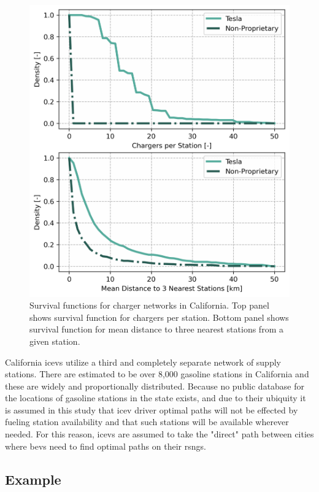 \documentclass[11pt]{article}
\begin{document}
\begin{multicols}{2}
\begin{figure}[H]
	\centering
	\includegraphics[width = \linewidth]{figs/California_Charger_Network_Survival_Functions.png}
	\caption{Survival functions for charger networks in California. Top panel shows survival function for chargers per station. Bottom panel shows survival function for mean distance to three nearest stations from a given station.}
	\label{fig:network_histograms}
\end{figure}

California \glspl{icev} utilize a third and completely separate network of supply stations. There are estimated to be over 8,000 gasoline stations in California \cite{CEC_2022} and these are widely and proportionally distributed. Because no public database for the locations of gasoline stations in the state exists, and due to their ubiquity it is assumed in this study that \gls{icev} driver optimal paths will not be effected by fueling station availability and that such stations will be available wherever needed. For this reason, \glspl{icev} are assumed to take the "direct" path between cities where \glspl{bev} need to find optimal paths on their \glspl{rsng}.

\subsection*{Example}


\end{multicols}
\end{document}
